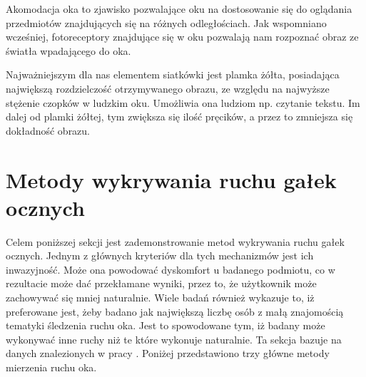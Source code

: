 Akomodacja oka to zjawisko pozwalające oku na dostosowanie się do oglądania przedmiotów znajdujących się na różnych odległościach. Jak wspomniano wcześniej, fotoreceptory znajdujące się w oku pozwalają nam rozpoznać obraz ze światła wpadającego do oka.\par
Najważniejszym dla nas elementem siatkówki jest plamka żółta, posiadająca największą rozdzielczość otrzymywanego obrazu, ze względu na najwyższe stężenie czopków w ludzkim oku. Umożliwia ona ludziom np. czytanie tekstu. Im dalej od plamki żółtej, tym zwiększa się ilość pręcików, a przez to zmniejsza się dokładność obrazu.
\section{Metody wykrywania ruchu gałek ocznych}
\label{sec:movement}
Celem poniższej sekcji jest zademonstrowanie metod wykrywania ruchu gałek ocznych. Jednym z głównych kryteriów dla tych mechanizmów jest ich inwazyjność. Może ona powodować dyskomfort u badanego podmiotu, co w rezultacie może dać przekłamane wyniki, przez to, że użytkownik może zachowywać się mniej naturalnie. Wiele badań również wykazuje to, iż preferowane jest, żeby badano jak największą liczbę osób z małą znajomością tematyki śledzenia ruchu oka. Jest to spowodowane tym, iż badany może wykonywać inne ruchy niż te które wykonuje naturalnie. Ta sekcja bazuje na danych znalezionych w pracy \cite{metodyeyetrack}. Poniżej przedstawiono trzy główne metody mierzenia ruchu oka.\par
